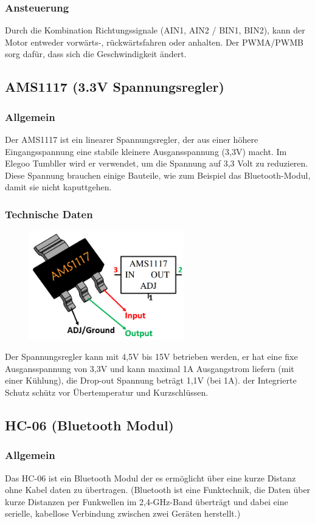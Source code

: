 \subsubsection{Ansteuerung}
Durch die Kombination Richtungssignale (AIN1, AIN2 / BIN1, BIN2), kann der Motor entweder vorwärts-, rückwärtsfahren oder anhalten.
Der PWMA/PWMB sorg dafür, dass sich die Geschwindigkeit ändert.
%
\subsection{AMS1117 (3.3V Spannungsregler)}
%
\subsubsection{Allgemein}
Der AMS1117 ist ein linearer Spannungsregler, der aus einer höhere Eingangsspannung eine stabile kleinere Ausgansspannung (3,3V) macht. 
Im Elegoo Tumbller wird er verwendet, um die Spannung auf 3,3 Volt zu reduzieren. Diese Spannung brauchen einige Bauteile, wie zum Beispiel das Bluetooth-Modul, damit sie nicht kaputtgehen.
\subsubsection{Technische Daten}
\begin{figure}[H]
    \includegraphics[width=0.6\textwidth, center]{img/Hardware/AMS1117.png}
\end{figure}
Der Spannungsregler kann mit 4,5V bis 15V betrieben werden, er hat eine fixe Ausgansspannung von 3,3V und kann maximal 1A Ausgangstrom liefern (mit einer Kühlung), 
die Drop-out Spannung beträgt 1,1V (bei 1A). der Integrierte Schutz schütz vor Übertemperatur und Kurzschlüssen.
%
\subsection{HC-06 (Bluetooth Modul)}
%
\subsubsection{Allgemein}
Das HC-06 ist ein Bluetooth Modul der es ermöglicht über eine kurze Distanz ohne Kabel daten zu übertragen. 
(Bluetooth ist eine Funktechnik, die Daten über kurze Distanzen per Funkwellen im 2,4-GHz-Band überträgt und dabei eine serielle, kabellose Verbindung zwischen zwei Geräten herstellt.)
